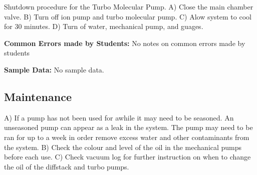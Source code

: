 \documentclass{book}
\begin{document}
{Shutdown procedure for the Turbo Molecular Pump.\newline
A) Close the main chamber valve. \newline
B) Turn off ion pump and turbo molecular pump.\newline
C) Alow system to cool for 30 minutes.\newline
D) Turn of water, mechanical pump, and guages.\newline

{\bf Common Errors made by Students:}
No notes on common errors made by students

{\bf Sample Data:}
No sample data.

\subsection{Maintenance}

A) If a pump has not been used for awhile it may need to be seasoned. An unseasoned pump can appear as a leak in the system. The pump may need to be ran for up to a week in order remove excess water and other contaminants from the system. \newline
B) Check the colour and level of the oil in the mechanical pumps before each use.\newline
C) Check vacuum log for further instruction on when to change the oil of the diffstack and turbo pumps.\newline

\newpage
}
\end{document}
